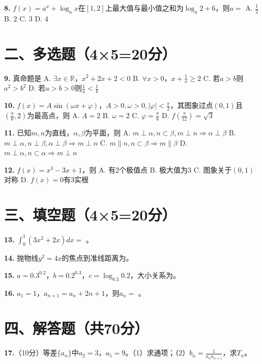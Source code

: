 \documentclass[12pt,a4paper]{ctexart}
\begin{document}
\textbf{8.} $f(x)=a^x+\log_ax$在$[1,2]$上最大值与最小值之和为$\log_a2+6$，则$a=$
A. $\frac12$ \quad B. $2$ \quad C. $3$ \quad D. $4$

\section*{二、多选题（4×5=20分）}

\textbf{9.} 真命题是
A. $\exists x\in\mathbb{R}$，$x^2+2x+2<0$ \quad B. $\forall x>0$，$x+\frac1x\ge2$
C. 若$a>b$则$a^2>b^2$ \quad D. 若$a>b>0$则$\frac1a<\frac1b$

\textbf{10.} $f(x)=A\sin(\omega x+\varphi)$，$A>0,\omega>0,|\varphi|<\frac{\pi}{2}$，其图象过点$(0,1)$且$(\frac{\pi}{6},2)$为最高点，则
A. $A=2$ \quad B. $\omega=2$ \quad C. $\varphi=\frac{\pi}{6}$ \quad D. $f(\frac{\pi}{12})=\sqrt3$

\textbf{11.} 已知$m,n$为直线，$\alpha,\beta$为平面，则
A. $m\perp\alpha,n\subset\beta,m\perp n\Rightarrow\alpha\perp\beta$
B. $m\perp\alpha,n\perp\beta,\alpha\perp\beta\Rightarrow m\perp n$
C. $m\parallel n,n\subset\beta\Rightarrow m\parallel\beta$
D. $m\perp\alpha,n\subset\alpha\Rightarrow m\perp n$

\textbf{12.} $f(x)=x^3-3x+1$，则
A. 有2个极值点 \quad B. 极大值为3 \quad C. 图象关于$(0,1)$对称 \quad D. $f(x)=0$有3实根

\section*{三、填空题（4×5=20分）}

\textbf{13.} $\int_0^1(3x^2+2x)dx=$ \underline{\hspace{2cm}}。

\textbf{14.} 抛物线$y^2=4x$的焦点到准线距离为\underline{\hspace{2cm}}。

\textbf{15.} $a=0.3^{0.2}$，$b=0.2^{0.3}$，$c=\log_{0.3}0.2$，大小关系为\underline{\hspace{2cm}}。

\textbf{16.} $a_1=1$，$a_{n+1}=a_n+2n+1$，则$a_n=$ \underline{\hspace{2cm}}。

\newpage
\section*{四、解答题（共70分）}

\textbf{17.}（10分）等差$\{a_n\}$中$a_2=3$，$a_5=9$。（1）求通项；（2）$b_n=\frac1{a_na_{n+1}}$，求$T_n$。
\end{document}
